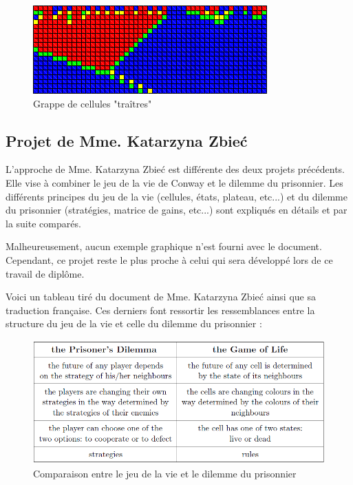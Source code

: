 \documentclass[a4paper]{article}
\begin{document}
\begin{figure}[htp]
    \centering
    \includegraphics[width=9cm]{defect_cluster.png}
    \caption{Grappe de cellules "traîtres"}
\end{figure}


\pagebreak
\subsection{Projet de Mme. Katarzyna Zbieć}
L'approche de Mme. Katarzyna Zbieć est différente des deux projets précédents. Elle vise à combiner le jeu de la vie de Conway et le dilemme du prisonnier. Les différents principes du jeu de la vie (cellules, états, plateau, etc...) et du dilemme du prisonnier (stratégies, matrice de gains, etc...) sont expliqués en détails et par la suite comparés.

Malheureusement, aucun exemple graphique n'est fourni avec le document. Cependant, ce projet reste le plus proche à celui qui sera développé lors de ce travail de diplôme.

Voici un tableau tiré du document de Mme. Katarzyna Zbieć ainsi que sa traduction française. Ces derniers font ressortir les ressemblances entre la structure du jeu de la vie et celle du dilemme du prisonnier :

\begin{figure}[htp]
    \centering
    \includegraphics[width=\linewidth - 3cm]{dilemma_gol.png}
    \caption{Comparaison entre le jeu de la vie et le dilemme du prisonnier}
\end{figure}
\end{document}
